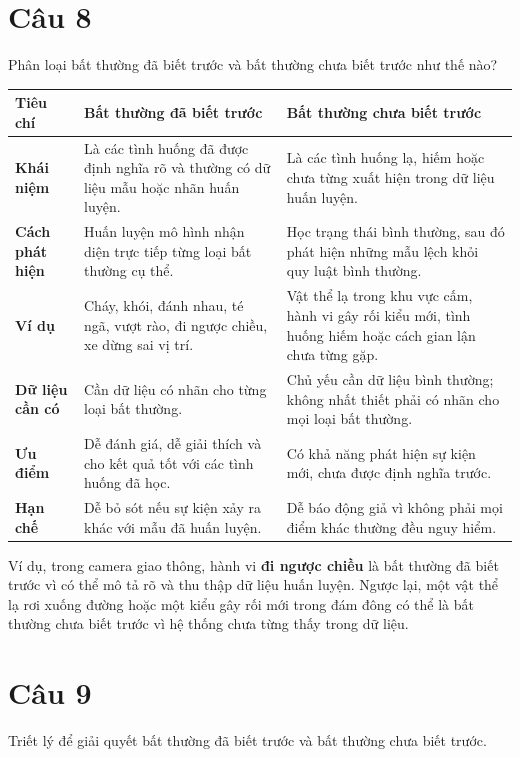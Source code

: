 \section*{Câu 8}
Phân loại bất thường đã biết trước và bất thường chưa biết trước như thế nào?

\small
\begin{longtable}{|p{}|p{}|p{}|}
\hline
\textbf{Tiêu chí} & \textbf{Bất thường đã biết trước} & \textbf{Bất thường chưa biết trước} \\
\hline
\textbf{Khái niệm} & Là các tình huống đã được định nghĩa rõ và thường có dữ liệu mẫu hoặc nhãn huấn luyện. & Là các tình huống lạ, hiếm hoặc chưa từng xuất hiện trong dữ liệu huấn luyện. \\
\hline
\textbf{Cách phát hiện} & Huấn luyện mô hình nhận diện trực tiếp từng loại bất thường cụ thể. & Học trạng thái bình thường, sau đó phát hiện những mẫu lệch khỏi quy luật bình thường. \\
\hline
\textbf{Ví dụ} & Cháy, khói, đánh nhau, té ngã, vượt rào, đi ngược chiều, xe dừng sai vị trí. & Vật thể lạ trong khu vực cấm, hành vi gây rối kiểu mới, tình huống hiếm hoặc cách gian lận chưa từng gặp. \\
\hline
\textbf{Dữ liệu cần có} & Cần dữ liệu có nhãn cho từng loại bất thường. & Chủ yếu cần dữ liệu bình thường; không nhất thiết phải có nhãn cho mọi loại bất thường. \\
\hline
\textbf{Ưu điểm} & Dễ đánh giá, dễ giải thích và cho kết quả tốt với các tình huống đã học. & Có khả năng phát hiện sự kiện mới, chưa được định nghĩa trước. \\
\hline
\textbf{Hạn chế} & Dễ bỏ sót nếu sự kiện xảy ra khác với mẫu đã huấn luyện. & Dễ báo động giả vì không phải mọi điểm khác thường đều nguy hiểm. \\
\hline
\end{longtable}
\normalsize

Ví dụ, trong camera giao thông, hành vi \textbf{đi ngược chiều} là bất thường đã biết trước vì có thể mô tả rõ và thu thập dữ liệu huấn luyện. Ngược lại, một vật thể lạ rơi xuống đường hoặc một kiểu gây rối mới trong đám đông có thể là bất thường chưa biết trước vì hệ thống chưa từng thấy trong dữ liệu.


\section*{Câu 9}
Triết lý để giải quyết bất thường đã biết trước và bất thường chưa biết trước.

